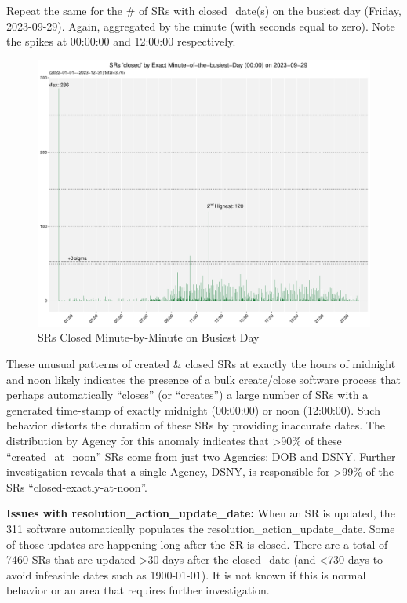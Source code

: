 \documentclass[linenumber]{jdsart}
\begin{document}
Repeat the same for the \# of SRs with closed\_date(s) 
on the busiest day (Friday, 2023-09-29). Again, aggregated by 
the minute (with seconds equal to zero). Note the spikes 
at 00:00:00 and 12:00:00 respectively. 


\begin{figure}[tbp]
	\centering
	\includegraphics[width=\textwidth]{2-year-trend-SR_closed_by_minute_of_busiest_day.pdf}
	\caption{SRs Closed Minute-by-Minute on Busiest Day}
	\label{fig:busiestclosed}
\end{figure}	


These unusual patterns of created \& closed SRs at exactly the hours 
of midnight and noon likely indicates the presence of a bulk create/close 
software process that perhaps automatically ``closes'' 
(or ``creates'') a large number of SRs with a generated time-stamp of exactly 
midnight (00:00:00) or noon (12:00:00). Such behavior distorts
 the duration of these SRs by providing inaccurate dates. The 
 distribution by Agency for this anomaly indicates 
 that \textgreater90\% of these ``created\_at\_noon'' SRs come from 
 just two Agencies: DOB and DSNY.  Further investigation
 reveals that  a single Agency, DSNY, is responsible 
 for \textgreater99\% of the SRs ``closed-exactly-at-noon''. 
	

\label{sec: resolutionaction}
\textbf{Issues with resolution\_action\_update\_date:} When an 
SR is updated, the 311 software automatically 
populates the resolution\_action\_update\_date. Some of 
those  updates are happening long after the SR is 
closed. There are a total of 7460 SRs that are updated \textgreater30 days 
after the closed\_date (and \textless{}730 days to avoid infeasible 
dates such as 1900-01-01). It is not known if this is normal behavior
 or an area that requires further investigation. 
	
\end{document}
